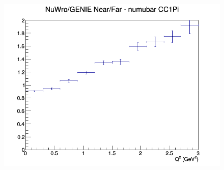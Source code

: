 \begin{figure}[h]
\endminipage
{}
\includegraphics[width=\linewidth]{eff_Q2/LAr/ratios/CC1Pi_NuWro_GENIE_numubar_NF_Q2.png}
\endminipage
\newline
\end{figure}
\clearpage
